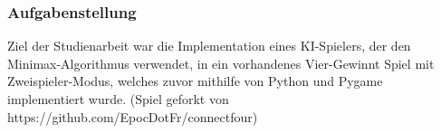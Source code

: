 \begin{frame}
\frametitle{Aufgabenstellung}
Ziel der Studienarbeit war die Implementation eines KI-Spielers, der den Minimax-Algorithmus verwendet, in ein vorhandenes Vier-Gewinnt Spiel mit Zweispieler-Modus, welches zuvor mithilfe von Python und Pygame implementiert wurde.
(Spiel geforkt von https://github.com/EpocDotFr/connectfour)
\end{frame}

